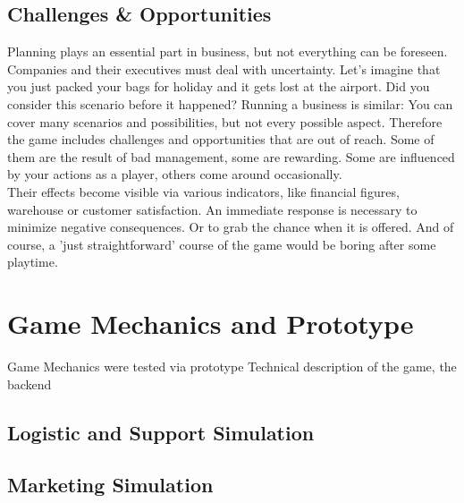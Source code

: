\documentclass[11pt,titlepage,oneside,openany]{book}
\begin{document}
\section{Challenges \& Opportunities}
Planning plays an essential part in business, but not everything can be foreseen. Companies and their executives must deal with uncertainty. Let's imagine that you just packed your bags for holiday and it gets lost at the airport. Did you consider this scenario before it happened? Running a business is similar: You can cover many scenarios and possibilities, but not every possible aspect. Therefore the game includes challenges and opportunities that are out of reach. Some of them are the result of bad management, some are rewarding. Some are influenced by your actions as a player, others come around occasionally. \\
Their effects become visible via various indicators, like financial figures, warehouse or customer satisfaction. An immediate response is necessary to minimize negative consequences. Or to grab the chance when it is offered. And of course, a 'just straightforward' course of the game would be boring after some playtime. 

\chapter{Game Mechanics and Prototype}
\label{cha:alg}
Game Mechanics were tested via prototype
Technical description of the game, the backend














\section{Logistic and Support Simulation}



\section{Marketing Simulation}
\label{markting_simulation}





\end{document}
